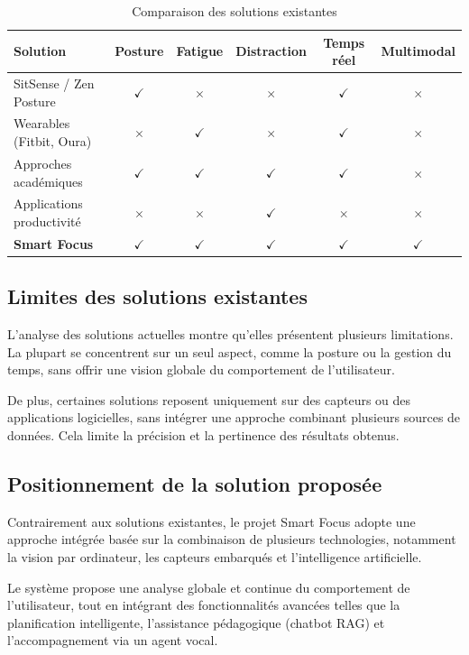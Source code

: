 \documentclass[12pt,a4paper]{report}
\begin{document}
\begin{table}[H]
\centering
\begin{tabular}{|l|c|c|c|c|c|}
\hline
\textbf{Solution} & \textbf{Posture} & \textbf{Fatigue} & \textbf{Distraction} & \textbf{Temps réel} & \textbf{Multimodal} \\
\hline
SitSense / Zen Posture  & $\checkmark$ & $\times$ & $\times$ & $\checkmark$ & $\times$ \\
\hline
Wearables (Fitbit, Oura) & $\times$ & $\checkmark$ & $\times$ & $\checkmark$ & $\times$ \\
\hline
Approches académiques    & $\checkmark$ & $\checkmark$ & $\checkmark$ & $\checkmark$ & $\times$ \\
\hline
Applications productivité & $\times$ & $\times$ & $\checkmark$ & $\times$ & $\times$ \\
\hline
\textbf{Smart Focus}     & $\checkmark$ & $\checkmark$ & $\checkmark$ & $\checkmark$ & $\checkmark$ \\
\hline
\end{tabular}
\caption{Comparaison des solutions existantes}
\label{tab:comparaison_solutions_existantes}
\end{table}

\subsection{Limites des solutions existantes}
L'analyse des solutions actuelles montre qu'elles présentent plusieurs limitations. La plupart se concentrent sur un seul aspect, comme la posture ou la gestion du temps, sans offrir une vision globale du comportement de l'utilisateur.

De plus, certaines solutions reposent uniquement sur des capteurs ou des applications logicielles, sans intégrer une approche combinant plusieurs sources de données. Cela limite la précision et la pertinence des résultats obtenus.

\subsection{Positionnement de la solution proposée}
Contrairement aux solutions existantes, le projet Smart Focus adopte une approche intégrée basée sur la combinaison de plusieurs technologies, notamment la vision par ordinateur, les capteurs embarqués et l'intelligence artificielle.

Le système propose une analyse globale et continue du comportement de l'utilisateur, tout en intégrant des fonctionnalités avancées telles que la planification intelligente, l'assistance pédagogique (chatbot \ac{RAG}) et l'accompagnement via un agent vocal.
\end{document}
